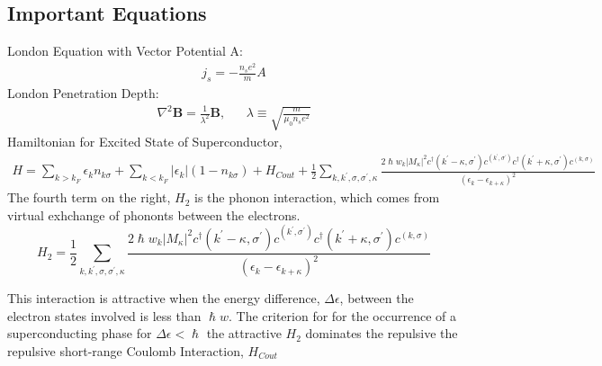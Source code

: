 \documentclass[11pt,letterpaper]{article}
\begin{document}
\subsection*{Important Equations}
London Equation with Vector Potential A:
\begin{equation} \label{eq1}
\begin{split}
j_s = - \frac{n_s e^2}{m}A
\end{split}
\end{equation}
London Penetration Depth:
\begin{align*}
    \nabla ^2 \mathbf{B} = \frac{1}{\lambda^2}\mathbf{B}, &&  \lambda \equiv \sqrt{\frac{m}{\mu_0 n_s e^2}}
\end{align*}
Hamiltonian for Excited State of Superconductor,
\begin{equation} \label{eq1}
\begin{split}
H = \sum_{k>k_F}\epsilon_kn_{k\sigma} + \sum_{k<k_F}|\epsilon_k|(1-n_{k\sigma}) + H_{Cout}+ \frac{1}{2} \sum^{}_{k,k^{'},\sigma,\sigma^{'},\kappa}\frac{2\hslash w_k|M_\kappa|^2c^{\dagger}(k^{'} - \kappa,\sigma^{'})c^(k^{'},\sigma^{'})c^{\dagger}(k^{'} + \kappa,\sigma^{'})c^(k,\sigma)}{(\epsilon_k - \epsilon_{k+\kappa})^2}
\end{split}
\end{equation}
The fourth term on the right, $H_2$ is the phonon interaction, which comes from virtual exhchange of phononts between the electrons.
$$H_2 =\frac{1}{2} \sum^{}_{k,k^{'},\sigma,\sigma^{'},\kappa}\frac{2\hslash w_k|M_\kappa|^2c^{\dagger}(k^{'} - \kappa,\sigma^{'})c^(k^{'},\sigma^{'})c^{\dagger}(k^{'} + \kappa,\sigma^{'})c^(k,\sigma)}{(\epsilon_k - \epsilon_{k+\kappa})^2}$$

This interaction is attractive when the energy difference, $\Delta \epsilon$, between the electron states involved is less than $\hslash w$.
\newline
The criterion for for the occurrence of a superconducting phase for $\Delta \epsilon < \hslash $ the attractive $H_2$ dominates the repulsive the repulsive short-range Coulomb Interaction, $H_{Cout}$
\newpage
\end{document}
